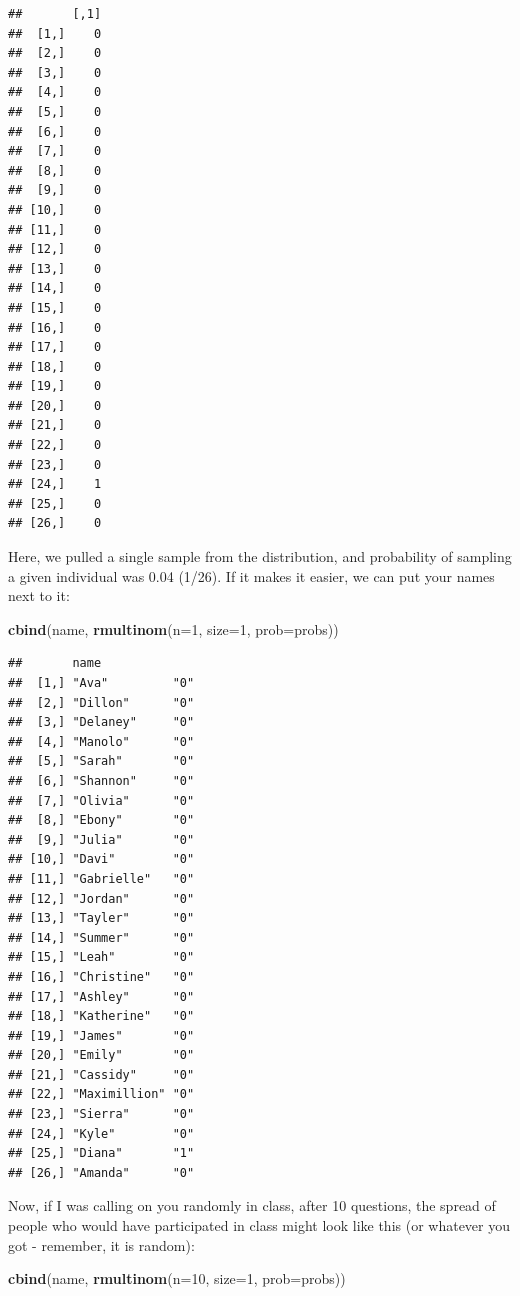 \documentclass[
]{book}
\newenvironment{Shaded}{\begin{snugshade}}{\end{snugshade}}
\newcommand{\DataTypeTok}[1]{\textcolor[rgb]{0.13,0.29,0.53}{#1}}
\newcommand{\DecValTok}[1]{\textcolor[rgb]{0.00,0.00,0.81}{#1}}
\newcommand{\KeywordTok}[1]{\textcolor[rgb]{0.13,0.29,0.53}{\textbf{#1}}}
\newcommand{\NormalTok}[1]{#1}
\begin{document}
\begin{verbatim}
##       [,1]
##  [1,]    0
##  [2,]    0
##  [3,]    0
##  [4,]    0
##  [5,]    0
##  [6,]    0
##  [7,]    0
##  [8,]    0
##  [9,]    0
## [10,]    0
## [11,]    0
## [12,]    0
## [13,]    0
## [14,]    0
## [15,]    0
## [16,]    0
## [17,]    0
## [18,]    0
## [19,]    0
## [20,]    0
## [21,]    0
## [22,]    0
## [23,]    0
## [24,]    1
## [25,]    0
## [26,]    0
\end{verbatim}

Here, we pulled a single sample from the distribution, and probability of sampling a given individual was 0.04 (1/26). If it makes it easier, we can put your names next to it:

\begin{Shaded}
\begin{Highlighting}[]
\KeywordTok{cbind}\NormalTok{(name, }\KeywordTok{rmultinom}\NormalTok{(}\DataTypeTok{n=}\DecValTok{1}\NormalTok{, }\DataTypeTok{size=}\DecValTok{1}\NormalTok{, }\DataTypeTok{prob=}\NormalTok{probs))}
\end{Highlighting}
\end{Shaded}

\begin{verbatim}
##       name             
##  [1,] "Ava"         "0"
##  [2,] "Dillon"      "0"
##  [3,] "Delaney"     "0"
##  [4,] "Manolo"      "0"
##  [5,] "Sarah"       "0"
##  [6,] "Shannon"     "0"
##  [7,] "Olivia"      "0"
##  [8,] "Ebony"       "0"
##  [9,] "Julia"       "0"
## [10,] "Davi"        "0"
## [11,] "Gabrielle"   "0"
## [12,] "Jordan"      "0"
## [13,] "Tayler"      "0"
## [14,] "Summer"      "0"
## [15,] "Leah"        "0"
## [16,] "Christine"   "0"
## [17,] "Ashley"      "0"
## [18,] "Katherine"   "0"
## [19,] "James"       "0"
## [20,] "Emily"       "0"
## [21,] "Cassidy"     "0"
## [22,] "Maximillion" "0"
## [23,] "Sierra"      "0"
## [24,] "Kyle"        "0"
## [25,] "Diana"       "1"
## [26,] "Amanda"      "0"
\end{verbatim}

Now, if I was calling on you randomly in class, after 10 questions, the spread of people who would have participated in class might look like this (or whatever you got - remember, it is random):

\begin{Shaded}
\begin{Highlighting}[]
\KeywordTok{cbind}\NormalTok{(name, }\KeywordTok{rmultinom}\NormalTok{(}\DataTypeTok{n=}\DecValTok{10}\NormalTok{, }\DataTypeTok{size=}\DecValTok{1}\NormalTok{, }\DataTypeTok{prob=}\NormalTok{probs))}
\end{Highlighting}
\end{Shaded}
\end{document}

